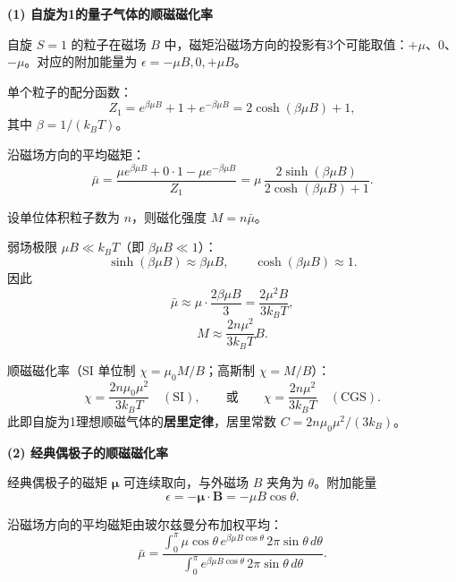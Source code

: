 \begin{derivationbox}[标准解题过程]
\textbf{(1) 自旋为1的量子气体的顺磁磁化率}

自旋 $S=1$ 的粒子在磁场 $B$ 中，磁矩沿磁场方向的投影有3个可能取值：$+\mu$、$0$、$-\mu$。对应的附加能量为 $\epsilon=-\mu B,0,+\mu B$。

单个粒子的配分函数：
\begin{equation}
Z_1=e^{\beta\mu B}+1+e^{-\beta\mu B}=2\cosh(\beta\mu B)+1,
\end{equation}
其中 $\beta=1/(k_BT)$。

沿磁场方向的平均磁矩：
\begin{equation}
\bar{\mu}=\frac{\mu e^{\beta\mu B}+0\cdot1-\mu e^{-\beta\mu B}}{Z_1}
=\mu\,\frac{2\sinh(\beta\mu B)}{2\cosh(\beta\mu B)+1}.
\end{equation}

设单位体积粒子数为 $n$，则磁化强度 $M=n\bar{\mu}$。

弱场极限 $\mu B\ll k_BT$（即 $\beta\mu B\ll1$）：
\begin{equation}
\sinh(\beta\mu B)\approx\beta\mu B,\qquad \cosh(\beta\mu B)\approx1.
\end{equation}
因此
\begin{equation}
\bar{\mu}\approx\mu\cdot\frac{2\beta\mu B}{3}=\frac{2\mu^2B}{3k_BT},
\end{equation}
\begin{equation}
M\approx\frac{2n\mu^2}{3k_BT}B.
\end{equation}

顺磁磁化率（SI 单位制 $\chi=\mu_0M/B$；高斯制 $\chi=M/B$）：
\begin{equation}
\boxed{\chi=\frac{2n\mu_0\mu^2}{3k_BT}\quad(\text{SI}),\qquad\text{或}\qquad\chi=\frac{2n\mu^2}{3k_BT}\quad(\text{CGS}).}
\end{equation}
此即自旋为1理想顺磁气体的\textbf{居里定律}，居里常数 $C=2n\mu_0\mu^2/(3k_B)$。

\textbf{(2) 经典偶极子的顺磁磁化率}

经典偶极子的磁矩 $\bm{\mu}$ 可连续取向，与外磁场 $B$ 夹角为 $\theta$。附加能量
\begin{equation}
\epsilon=-\bm{\mu}\cdot\bm{B}=-\mu B\cos\theta.
\end{equation}

沿磁场方向的平均磁矩由玻尔兹曼分布加权平均：
\begin{equation}
\bar{\mu}=\frac{\int_0^\pi\mu\cos\theta\,e^{\beta\mu B\cos\theta}\,2\pi\sin\theta\,d\theta}{\int_0^\pi e^{\beta\mu B\cos\theta}\,2\pi\sin\theta\,d\theta}.
\end{equation}


\end{derivationbox}
